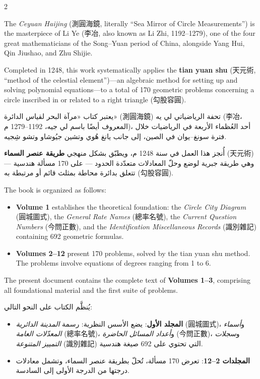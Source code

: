 \documentclass[11pt,a4paper]{article}
\newcommand{\ar}[1]{\arabicfont\beginR #1\endR}
\begin{document}
\begin{paracol}{2}

The \textit{Ceyuan Haijing} (測圓海鏡, literally ``Sea Mirror of Circle Measurements'') is the masterpiece of Li Ye (李冶, also known as Li Zhi, 1192–1279), one of the four great mathematicians of the Song--Yuan period of China, alongside Yang Hui, Qin Jiushao, and Zhu Shijie.

Completed in 1248, this work systematically applies the \textbf{tian yuan shu} (天元術, ``method of the celestial element'')---an algebraic method for setting up and solving polynomial equations---to a total of 170 geometric problems concerning a circle inscribed in or related to a right triangle (勾股容圓).

\switchcolumn

\ar{يعتبر كتاب «مرآة البحر لقياس الدائرة» (測圓海鏡) تحفة الرياضياتي لي يه (李冶، المعروف أيضًا باسم لي جيه، 1192–1279 م)، أحد العُظماء الأربعة في الرياضيات خلال فترة سونغ–يوان في الصين، إلى جانب يانغ هُوي وتشين جيُوشاو وتشو شِجيه.}

\vspace{0.3cm}

\ar{أُنجز هذا العمل في سنة 1248 م، ويطبّق بشكل منهجي \textbf{طريقة عنصر السماء} (天元術) — وهي طريقة جبرية لوضع وحلّ المعادلات متعدّدة الحدود — على 170 مسألة هندسية تتعلق بدائرة محاطة بمثلث قائم أو مرتبطة به (勾股容圓).}

\switchcolumn*

The book is organized as follows:
\begin{itemize}[leftmargin=2em]
  \item \textbf{Volume 1} establishes the theoretical foundation: the \textit{Circle City Diagram} (圓城圖式), the \textit{General Rate Names} (總率名號), the \textit{Current Question Numbers} (今問正數), and the \textit{Identification Miscellaneous Records} (識別雜記) containing 692 geometric formulas.
  \item \textbf{Volumes 2--12} present 170 problems, solved by the tian yuan shu method. The problems involve equations of degrees ranging from 1 to 6.
\end{itemize}

The present document contains the complete text of \textbf{Volumes 1--3}, comprising all foundational material and the first suite of problems.

\switchcolumn

\ar{يُنظَّم الكتاب على النحو التالي:}
\begin{itemize}[leftmargin=2em,rightmargin=0em]
  \item \ar{\textbf{المجلد الأول}: يضع الأسس النظرية: رسمة \textit{المدينة الدائرية} (圓城圖式)، و\textit{أسماء المعدّلات العامة} (總率名號)، و\textit{أعداد المسائل الحاضرة} (今問正數)، و\textit{سجلات التمييز المتنوعة} (識別雜記) التي تحتوي على 692 صيغة هندسية.}
  \item \ar{\textbf{المجلدات 2–12}: تعرض 170 مسألة، تُحلّ بطريقة عنصر السماء، وتشمل معادلات درجتها من الدرجة الأولى إلى السادسة.}
\end{itemize}


\end{paracol}
\end{document}
